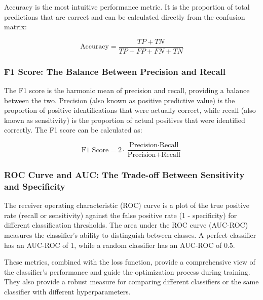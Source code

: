 Accuracy is the most intuitive performance metric. It is the proportion of total predictions that are correct and can be
calculated directly from the confusion matrix:

\begin{equation}
    \text{Accuracy} = \frac{TP + TN}{TP + FP + FN + TN}
\end{equation}

\subsubsection{F1 Score: The Balance Between Precision and Recall}

The F1 score is the harmonic mean of precision and recall, providing a balance between the two. Precision (also known as
positive predictive value) is the proportion of positive identifications that were actually correct, while recall (also
known as sensitivity) is the proportion of actual positives that were identified correctly. The F1 score can be
calculated as:

\begin{equation}
    \text{F1 Score} = 2 \cdot \frac{\text{Precision} \cdot \text{Recall}}{\text{Precision} + \text{Recall}}
\end{equation}

\subsubsection{ROC Curve and AUC: The Trade-off Between Sensitivity and Specificity}

The receiver operating characteristic (ROC) curve is a plot of the true positive rate (recall or sensitivity) against
the false positive rate (1 - specificity) for different classification thresholds. The area under the ROC curve
(AUC-ROC) measures the classifier's ability to distinguish between classes. A perfect classifier has an AUC-ROC of 1,
while a random classifier has an AUC-ROC of 0.5.

These metrics, combined with the loss function, provide a comprehensive view of the classifier's performance and guide
the optimization process during training. They also provide a robust measure for comparing different classifiers or the
same classifier with different hyperparameters.